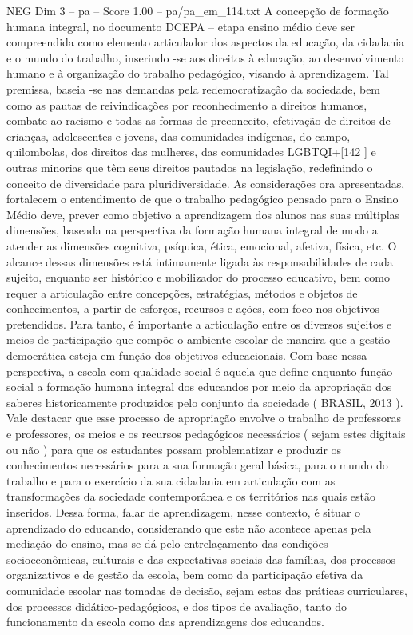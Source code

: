 \begin{textsample}{NEG Dim 3 – pa – Score 1.00 – pa/pa\_em\_114.txt}
A concepção de formação humana integral, no documento DCEPA – etapa ensino médio deve ser compreendida como elemento articulador dos aspectos da educação, da cidadania e o mundo do trabalho, inserindo -se aos direitos à educação, ao desenvolvimento humano e à organização do trabalho pedagógico, visando à aprendizagem.
Tal premissa, baseia -se nas demandas pela redemocratização da sociedade, bem como as pautas de reivindicações por reconhecimento a direitos humanos, combate ao racismo e todas as formas de preconceito, efetivação de direitos de crianças, adolescentes e jovens, das comunidades indígenas, do campo, quilombolas, dos direitos das mulheres, das comunidades LGBTQI+[142 ] e outras minorias que têm seus direitos pautados na legislação, redefinindo o conceito de diversidade para pluridiversidade.
As considerações ora apresentadas, fortalecem o entendimento de que o trabalho pedagógico pensado para o Ensino Médio deve, prever como objetivo a aprendizagem dos alunos nas suas múltiplas dimensões, baseada na perspectiva da formação humana integral de modo a atender as dimensões cognitiva, psíquica, ética, emocional, afetiva, física, etc.
O alcance dessas dimensões está intimamente ligada às responsabilidades de cada sujeito, enquanto ser histórico e mobilizador do processo educativo, bem como requer a articulação entre concepções, estratégias, métodos e objetos de conhecimentos, a partir de esforços, recursos e ações, com foco nos objetivos pretendidos.
Para tanto, é importante a articulação entre os diversos sujeitos e meios de participação que compõe o ambiente escolar de maneira que a gestão democrática esteja em função dos objetivos educacionais.
Com base nessa perspectiva, a escola com qualidade social é aquela que define enquanto função social a formação humana integral dos educandos por meio da apropriação dos saberes historicamente produzidos pelo conjunto da sociedade ( BRASIL, 2013 ).
Vale destacar que esse processo de apropriação envolve o trabalho de professoras e professores, os meios e os recursos pedagógicos necessários ( sejam estes digitais ou não ) para que os estudantes possam problematizar e produzir os conhecimentos necessários para a sua formação geral básica, para o mundo do trabalho e para o exercício da sua cidadania em articulação com as transformações da sociedade contemporânea e os territórios nas quais estão inseridos.
Dessa forma, falar de aprendizagem, nesse contexto, é situar o aprendizado do educando, considerando que este não acontece apenas pela mediação do ensino, mas se dá pelo entrelaçamento das condições socioeconômicas, culturais e das expectativas sociais das famílias, dos processos organizativos e de gestão da escola, bem como da participação efetiva da comunidade escolar nas tomadas de decisão, sejam estas das práticas curriculares, dos processos didático-pedagógicos, e dos tipos de avaliação, tanto do funcionamento da escola como das aprendizagens dos educandos.

\end{textsample}
